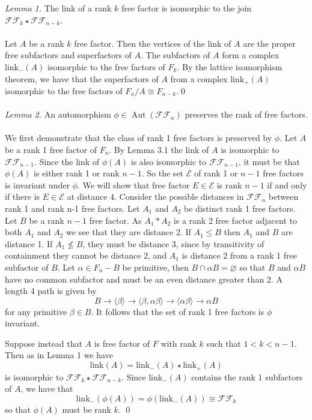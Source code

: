 \documentclass[12pt]{article}
\newcommand{\Aut}[1]{\ensuremath{ \aaut \left (#1 \right ) }}
\newcommand{\ffn}{{\ensuremath{ \mathcal {FF}_n }}}
\DeclareMathOperator{\aaut}{Aut}
\begin{document}
\noindent \emph{Lemma 1.} The link of a rank $k$ free factor is isomorphic to the join $\mathcal{FF}_{k} \star \mathcal{FF}_{n-k}$.\\
\\
Let $A$ be a rank $k$ free factor.
Then the vertices of the link of $A$ are the proper free subfactors and superfactors of $A$.
The subfactors of $A$ form a complex $\mbox{link}_-(A)$ isomorphic to the free factors of $F_k$.
By the lattice isomorphism theorem, we have that the superfactors of $A$ from a complex $\mbox{link}_+ (A)$ isomorphic to the free factors of $F_n/A \cong F_{n-k}$.\qed \\
\\

\noindent \emph{Lemma 2.} An automorphism $\phi \in \Aut \ffn$ preserves the rank of free factors.\\
\\
We first demonstrate that the class of rank 1 free factors is preserved by $\phi$.
Let $A$ be a rank 1 free factor of $F_n$.
By Lemma 3.1 the link of $A$ is isomorphic to $\mathcal{FF}_{n-1}$.
Since the link of $\phi(A)$ is also isomorphic to $\mathcal{FF}_{n-1}$, it must be that $\phi(A)$ is either rank 1 or rank $n-1$.
So the set $\mathcal E$ of rank 1 or $n-1$ free factors is invariant under $\phi$.
We will show that free factor $E \in \mathcal E$ is rank $n-1$ if and only if there is $E \in \mathcal E$ at distance 4.
Consider the possible distances in $\mathcal {FF}_n$ between rank 1 and rank n-1 free factors. Let $A_1$ and $A_2$ be distinct rank 1 free factors. Let $B$ be a rank $n-1$ free factor. As $A_1 \ast A_2$ is a rank 2 free factor adjacent to both $A_1$ and $A_2$ we see that they are distance 2. If $A_1 \leq B$ then $A_1$ and $B$ are distance 1. If $A_1 \not \leq B$, they must be distance 3, since by transitivity of containment they cannot be distance 2, and $A_1$ is distance 2 from a rank 1 free subfactor of $B$. Let $\alpha \in F_n-B$ be primitive, then $B \cap \alpha B =\varnothing$ so that $B$ and $\alpha B$ have no common subfactor and must be an even distance greater than 2. A length 4 path is given by $$B  \to \langle  \beta \rangle \to \langle \beta , \alpha \beta  \rangle \to \langle \alpha \beta \rangle \to  \alpha B$$ for any primitive $\beta \in B$.
It follows that the set of rank 1 free factors is $\phi$ invariant.

Suppose instead that $A$ is free factor of $F$ with rank $k$ such that  $1<k<n-1$.
Then as in Lemma 1 we have
$$\mbox{link} (A) = \mbox{link}_- (A)  \star \mbox{link}_+ (A)$$ 
is isomorphic to $\mathcal{FF}_{k} \star \mathcal{FF}_{n-k}$.
Since $\mbox{link}_- (A)$ contains the rank 1 subfactors of $A$, we have that 
$$
\mbox{link}_-  \left ( \phi(A)  \right ) 
=
\phi( \mbox{link}_- (A) )
\cong \mathcal{FF}_k
$$
so that $\phi(A)$ must be rank $k$. \qed \\
\\
\end{document}
